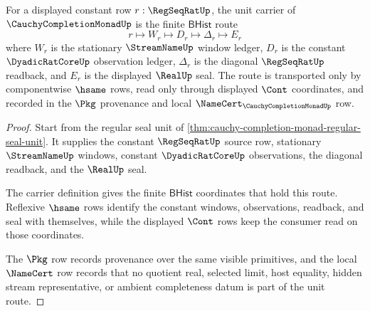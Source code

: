 \begin{theorem}
\label{thm:cauchycompletionmonad-unit-seal-route}
For a displayed constant row $r:\RegSeqRatUp$, the unit carrier of $\CauchyCompletionMonadUp$ is the finite $\mathsf{BHist}$ route
$$
r \longmapsto W_r \longmapsto D_r \longmapsto \Delta_r \longmapsto E_r
$$
where $W_r$ is the stationary $\StreamNameUp$ window ledger, $D_r$ is the constant $\DyadicRatCoreUp$ observation ledger, $\Delta_r$ is the diagonal $\RegSeqRatUp$ readback, and $E_r$ is the displayed $\RealUp$ seal. The route is transported only by componentwise $\hsame$ rows, read only through displayed $\Cont$ coordinates, and recorded in the $\Pkg$ provenance and local $\NameCert_{\CauchyCompletionMonadUp}$ row.
\end{theorem}
\begin{proof}
Start from the regular seal unit of \autoref{thm:cauchy-completion-monad-regular-seal-unit}. It supplies the constant $\RegSeqRatUp$ source row, stationary $\StreamNameUp$ windows, constant $\DyadicRatCoreUp$ observations, the diagonal readback, and the $\RealUp$ seal.

The carrier definition gives the finite $\mathsf{BHist}$ coordinates that hold this route. Reflexive $\hsame$ rows identify the constant windows, observations, readback, and seal with themselves, while the displayed $\Cont$ rows keep the consumer read on those coordinates.

The $\Pkg$ row records provenance over the same visible primitives, and the local $\NameCert$ row records that no quotient real, selected limit, host equality, hidden stream representative, or ambient completeness datum is part of the unit route.
\end{proof}

